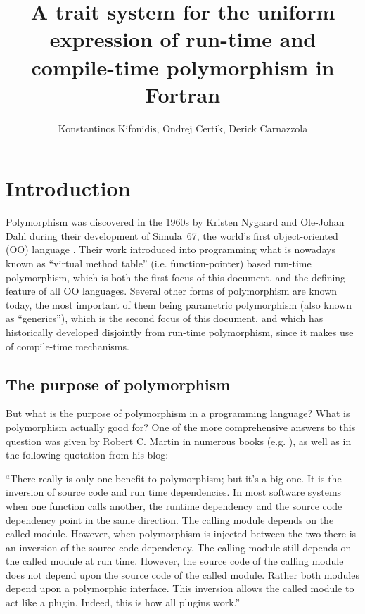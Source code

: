 \documentclass[11pt,oneside]{report}
\begin{document}
\title{A trait system for the uniform expression of run-time
       and compile-time polymorphism in Fortran}

\author{Konstantinos Kifonidis, Ondrej Certik, Derick Carnazzola}

\maketitle


\chapter{Introduction}

Polymorphism was discovered in the 1960s by Kristen Nygaard and
Ole-Johan Dahl during their development of Simula~67, the world's
first object-oriented (OO) language \cite{Dahl_04}. Their work
introduced into programming what is nowadays known as ``virtual method
table'' (i.e. function-pointer) based run-time polymorphism, which is
both the first focus of this document, and the defining feature of all
OO languages. Several other forms of polymorphism are known today, the
most important of them being parametric polymorphism
\cite{Cardelli_Wegner_85} (also known as ``generics''), which is the
second focus of this document, and which has historically developed
disjointly from run-time polymorphism, since it makes use of
compile-time mechanisms.


\section{The purpose of polymorphism}

But what is the purpose of polymorphism in a programming language?
What is polymorphism actually good for? One of the more comprehensive
answers to this question was given by Robert C. Martin in numerous
books (e.g. \cite{Martin_17}), as well as in the following quotation
from his blog:

\begin{displayquote}
``There really is only one benefit to polymorphism; but it's a big
  one. It is the inversion of source code and run time
  dependencies. In most software systems when one function calls
  another, the runtime dependency and the source code dependency point
  in the same direction. The calling module depends on the called
  module. However, when polymorphism is injected between the two there
  is an inversion of the source code dependency. The calling module
  still depends on the called module at run time. However, the source
  code of the calling module does not depend upon the source code of
  the called module. Rather both modules depend upon a polymorphic
  interface. This inversion allows the called module to act like a
  plugin. Indeed, this is how all plugins work.''
\end{displayquote}
\end{document}

